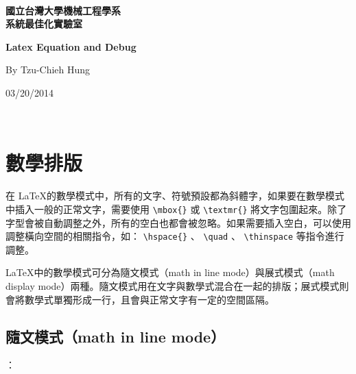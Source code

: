 \documentclass[12pt,a4paper]{report}
\begin{document}
\begin{CJK}{UTF8}{bkai}
\thispagestyle{empty}
\begin{center}
       ~\\
        \vspace{6.8cm}

        \textbf{\Huge
國立台灣大學機械工程學系 \\
系統最佳化實驗室
}
        \vspace{3cm}

        \textbf{\Huge
	Latex Equation and Debug
        }
        \vspace{6cm}

        {\large
        By  Tzu-Chieh Hung
        }
        \vspace{4cm}

        {\large
            03/20/2014
        }
    \end{center}

\newpage



\thispagestyle{empty}
~
\newpage
\clearpage
\setcounter{page}{1}
\chapter{數學排版}

在 \LaTeX 的數學模式中，所有的文字、符號預設都為斜體字，如果要在數學模式中插入一般的正常文字，需要使用 \verb|\mbox{}| 或 \verb|\textmr{}| 將文字包圍起來。除了字型會被自動調整之外，所有的空白也都會被忽略。如果需要插入空白，可以使用調整橫向空間的相關指令，如： \verb|\hspace{}| 、 \verb|\quad| 、 \verb|\thinspace| 等指令進行調整。

\LaTeX 中的數學模式可分為隨文模式（math in line mode）與展式模式（math display mode）兩種。隨文模式用在文字與數學式混合在一起的排版；展式模式則會將數學式單獨形成一行，且會與正常文字有一定的空間區隔。

\section{隨文模式（math in line mode）}
：
\begin{enumerate}
	

\end{enumerate}
\end{CJK}
\end{document}
